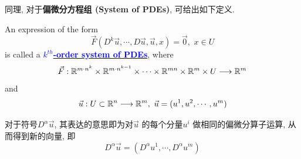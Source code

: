 	同理, 对于\textbf{偏微分方程组 (System of PDEs)}, 可给出如下定义.
	\begin{defn}\label{def 1.1.3}
		An expression of the form
		\[ \vec{F}(D^k \vec{u} , \cdots , D \vec{u} , \vec{u} , x) = \vec{0} , \,\, x \in U \]
		is called a \underline{\textcolor{blue}{\textbf{$k^{th}$-order system of PDEs}}},  where
		\[ \vec{F} : \mathbb{R}^{m \cdot n^k} \times \mathbb{R}^{m \cdot n^{k - 1}} \times \cdots \times \mathbb{R}^{mn} \times \mathbb{R}^m \times U \longrightarrow \mathbb{R}^m \]
		and
		\[ \vec{u} : U \subset \mathbb{R}^n \longrightarrow \mathbb{R}^m , \,\, \vec{u} = (u^1 , u^2 , \cdots , u^m) \]
		
		\vspace{2em}
		
		\begin{rmk}
			对于符号$D^{\alpha} \vec{u}$, 其表达的意思即为对$\vec{u}$ 的每个分量$u^i$ 做相同的偏微分算子运算, 从而得到新的向量, 即
			\[ D^{\alpha} \vec{u} = (D^{\alpha} u^1 , \cdots , D^{\alpha} u^m) \]
		\end{rmk}
	\end{defn}

\newpage	
	
